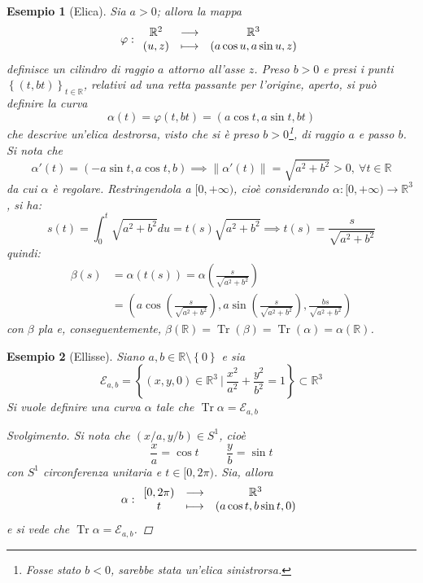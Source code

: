 \documentclass[12pt]{scrartcl}
\theoremstyle{style}
\newtheorem{esempio}{Esempio}[section]
\newenvironment{svolgimento}{\renewcommand\qedsymbol{$\blacksquare$}\begin{proof}[Svolgimento]}{\end{proof}}
\numberwithin{equation}{subsection}
\begin{document}
\begin{esempio}
	[Elica]
Sia $a > 0$; allora la mappa
\[
\varphi :
\begin{array}
	{c c c}
	\mathbb{R}^2 & \longrightarrow & \mathbb{R}^3\\
	(u,z) &\longmapsto & (a \cos u , a \sin u , z)
\end{array}
\] 
definisce un cilindro di raggio $a$ attorno all'asse $z$.
Preso $b > 0$ e presi i punti $\left\{ (t,bt) \right\} _{t \in \mathbb{R}} $, relativi ad una retta passante per l'origine, aperto, si pu\`o definire la curva 
\[
\alpha (t) = \varphi (t,bt) = (a \cos t , a \sin t , bt)
\] 
che descrive un'\textit{elica destrorsa}, visto che si \`e preso $b>0$\footnote{Fosse stato $b<0$, sarebbe stata un'\textit{elica sinistrorsa}.}, di raggio $a$ e passo $b$.
Si nota che
\[
\alpha '(t) = (-a \sin t, a \cos t , b) \implies \left\lVert \alpha '(t) \right\rVert =\sqrt{a^2 + b^2} > 0, \ \forall t \in \mathbb{R}
\] 
da cui $\alpha $ \`e regolare. 
Restringendola a $[0,+\infty)$, cio\`e considerando $\alpha : [0,+\infty) \to \mathbb{R}^{3} $, si ha:
\[
	s(t) = \int_{0} ^t \sqrt{a^2 + b^2 }  du = t(s) \sqrt{a^2 + b^2} \implies t(s) = \frac{s}{\sqrt{a^2 +b^2}}
\] 
quindi:
\[
\begin{split}
		 \beta (s) &= \alpha (t(s)) = \alpha  \left(\frac{s}{\sqrt{a^2 + b^2} }\right) \\
	&= \left(a \cos \left(\frac{s}{\sqrt{a^2+b^2} }\right) , a\sin \left(\frac{s}{\sqrt{a^2 + b^2} }\right),\frac{bs}{\sqrt{a^2 + b^2} } \right)
	\end{split} 
\] 
con $\beta $ pla e, conseguentemente, $\beta (\mathbb{R}) = \operatorname{Tr} (\beta ) = \operatorname{Tr} (\alpha ) = \alpha (\mathbb{R})$.
\end{esempio}
\begin{esempio}
	[Ellisse]
	Siano $a,b \in \mathbb{R}\setminus\left\{ 0 \right\} $ e sia 
	\[
	\mathcal{E} _{a,b} = \left\{ (x,y,0) \in \mathbb{R}^3  \ \bigg\lvert \ \frac{x^2}{a^2} + \frac{y^2}{b^2} = 1\right\} \subset \mathbb{R}^3
	\] 
	Si vuole definire una curva $\alpha $ tale che $\operatorname{Tr} \alpha = \mathcal{E} _{a,b} $
	\begin{svolgimento}
		Si nota che $(x /  a , y / b) \in S^1$, cio\`e
	\[
	\frac{x}{a} = \cos t \hspace{1cm}\frac{y}{b} = \sin t
	\] 
	con $S^1$ circonferenza unitaria e $t\in [0,2\pi)$.
	Sia, allora
	\[
\alpha :
	\begin{array}
		{c c c}
		[0,2\pi) &\longrightarrow & \mathbb{R}^3\\
		t & \longmapsto & (a \cos t , b \sin t, 0)
	\end{array}
	\] 
 e si vede che $\operatorname{Tr} \alpha  = \mathcal{E} _{a,b} $.

	\end{svolgimento}
\end{esempio}
\end{document}
